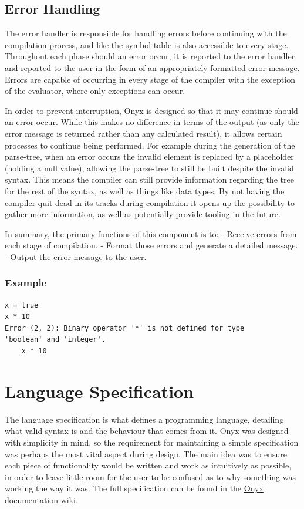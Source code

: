\documentclass[
]{report}
\begin{document}
\subsection{Error Handling}
The error handler is responsible for handling errors before continuing
with the compilation process, and like the \gls{symbol-table} is also
accessible to every stage. Throughout each phase should an error occur,
it is reported to the error handler and reported to the user in the form
of an appropriately formatted error message. Errors are capable of
occurring in every stage of the compiler with the exception of the
evaluator, where only exceptions can occur.

In order to prevent interruption, Onyx is designed so that it may
continue should an error occur. While this makes no difference in terms
of the output (as only the error message is returned rather than any
calculated result), it allows certain processes to continue being
performed. For example during the generation of the \gls{parse-tree}, when an
error occurs the invalid element is replaced by a placeholder (holding a
null value), allowing the \gls{parse-tree} to still be built despite the
invalid syntax. This means the compiler can still provide information
regarding the tree for the rest of the syntax, as well as things like
data types. By not having the compiler quit dead in its tracks during
compilation it opens up the possibility to gather more information, as
well as potentially provide tooling in the future.

In summary, the primary functions of this component is to: - Receive
errors from each stage of compilation. - Format those errors and
generate a detailed message. - Output the error message to the user.

\subsubsection{Example}
\begin{verbatim}
x = true
x * 10
Error (2, 2): Binary operator '*' is not defined for type 
'boolean' and 'integer'.
    x * 10
\end{verbatim}

\section{Language Specification}
The language specification is what defines a programming language,
detailing what valid syntax is and the behaviour that comes from it.
Onyx was designed with simplicity in mind, so the requirement for
maintaining a simple specification was perhaps the most vital aspect
during design. The main idea was to ensure each piece of functionality
would be written and work as intuitively as possible, in order to leave
little room for the user to be confused as to why something was working
the way it was. The full specification can be found in the
\href{https://github.com/louislefevre/onyx-compiler/wiki}{Onyx
documentation wiki}.
\end{document}
